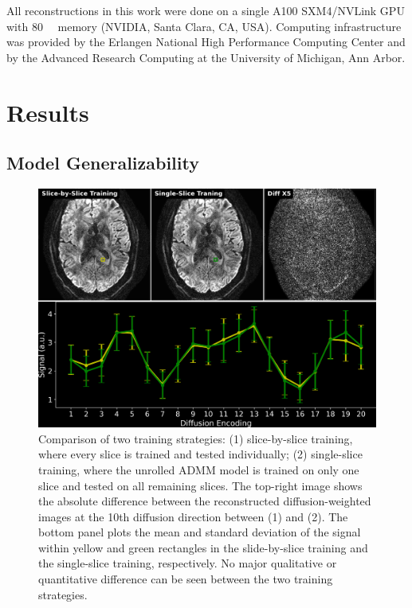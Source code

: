 \documentclass[journal,twoside,web]{ieeecolor}
\begin{document}
	All reconstructions in this work were done on a single A100 SXM4/NVLink GPU
	with \SI{80}{\giga\byte} memory (NVIDIA, Santa Clara, CA, USA).
	Computing infrastructure was provided by
	the Erlangen National High Performance Computing Center and 
	by the Advanced Research Computing at the University of Michigan, Ann Arbor.

	\section{Results}

	\subsection{Model Generalizability}
	
	\begin{figure}
		\begin{minipage}[c]{0.75\textwidth}
			\includegraphics[width=\textwidth]{../figures/fig2.png}
		\end{minipage}\hfill
		\begin{minipage}[c]{0.23\textwidth}
			\caption{Comparison of two training strategies: 
				(1) slice-by-slice training, 
				where every slice is trained and tested individually; 
				(2) single-slice training, 
				where the unrolled ADMM model is trained on only one slice 
				and tested on all remaining slices.
				The top-right image shows the absolute difference 
				between the reconstructed diffusion-weighted images 
				at the 10th diffusion direction 
				between (1) and (2). 
				The bottom panel plots the mean and standard deviation 
				of the signal within yellow and green rectangles 
				in the slide-by-slice training and the single-slice training, 
				respectively. 
				No major qualitative or quantitative difference can be seen 
				between the two training strategies.}
			\label{FIG:GENERALIZATION}
		\end{minipage}
	\end{figure}
	
\end{document}
